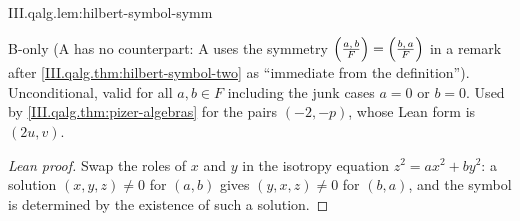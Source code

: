 \begin{lemma}
\bonly
{}
\end{lemma}
\begin{tfformal}{III.qalg.lem:hilbert-symbol-symm}
\begin{tffidelity}
B-only (A has no counterpart: A uses the symmetry $\Bigl(\tfrac{a,\,b}{F}\Bigr)=\Bigl(\tfrac{b,\,a}{F}\Bigr)$ in a remark after \cref{III.qalg.thm:hilbert-symbol-two} as ``immediate from the definition''). Unconditional, valid for all $a,b\in F$ including the junk cases $a=0$ or $b=0$. Used by \cref{III.qalg.thm:pizer-algebras} for the pairs $(-2,-p)$, whose Lean form is $(2u,v)$.
\end{tffidelity}
\end{tfformal}
\begin{proof}[Lean proof]
Swap the roles of $x$ and $y$ in the isotropy equation $z^2=ax^2+by^2$: a solution $(x,y,z)\neq0$ for $(a,b)$ gives $(y,x,z)\neq0$ for $(b,a)$, and the symbol is determined by the existence of such a solution.
\end{proof}

